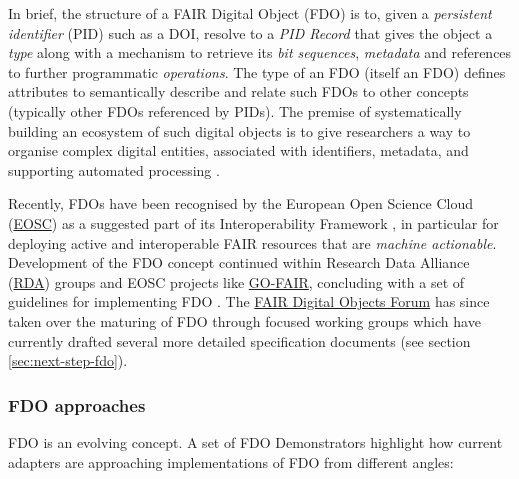 \documentclass[fleqn,10pt,lineno]{wlpeerjlua}
\begin{document}
In brief, the structure of a FAIR Digital Object (FDO) is to, given a \emph{persistent identifier} (PID) such as a DOI, resolve to a \emph{PID Record} that gives the object a \emph{type} along with a mechanism to retrieve its \emph{bit sequences}, \emph{metadata} and references to further programmatic \emph{operations}. The type of an FDO (itself an FDO) defines attributes to semantically describe and relate such FDOs to other concepts (typically other FDOs referenced by PIDs). The premise of systematically building an ecosystem of such digital objects is to give researchers a way to organise complex digital entities, associated with identifiers, metadata, and supporting automated processing \autocite{wittenburgDigitalObjectsDrivers2019a}.

Recently, FDOs have been recognised by the European Open Science Cloud (\href{https://eosc.eu/}{EOSC}) as a suggested part of its Interoperability Framework \autocite{corchoEOSCInteroperabilityFramework2021b}, in particular for deploying active and interoperable FAIR resources that are \emph{machine actionable}. Development of the FDO concept continued within Research Data Alliance (\href{https://www.rd-alliance.org/}{RDA}) groups and EOSC projects like \href{https://www.go-fair.org/}{GO-FAIR}, concluding with a set of guidelines for implementing FDO \autocite{boninoFAIRDigitalObject}. The \href{https://fairdo.org/}{FAIR Digital Objects Forum} has since taken over the maturing of FDO through focused working groups which have currently drafted several more detailed specification documents (see section \ref{sec:next-step-fdo}).

\hypertarget{fdo-approaches}{%
\subsubsection*{FDO approaches}\label{fdo-approaches}}

FDO is an evolving concept. A set of FDO Demonstrators \autocite{wittenburgFAIRDigitalObject2022b} highlight how current adapters are approaching implementations of FDO from different angles:
\end{document}
